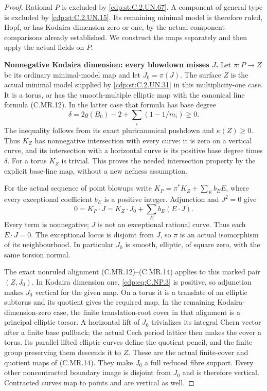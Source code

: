 \begin{proof}
Rational \(P\) is excluded by \ref{cdp:st:C.2.UN.67}. A component
of general type is excluded by \ref{cdp:st:C.2.UN.15}. Its remaining
minimal model is therefore ruled, Hopf, or has
Kodaira dimension zero or one, by the actual
component comparisons already established.
We construct the maps separately and then
apply the actual fields on \(P\).

\par\medskip\noindent\textbf{Nonnegative Kodaira dimension: every blowdown misses \(J\).}
Let \(\pi:P\to Z\) be its ordinary minimal-model
map and let \(J_0=\pi(J)\). The surface \(Z\)
is the actual minimal model supplied by
\ref{cdp:st:C.2.UN.31} in this multiplicity-one case. It is
a torus, or has the smooth-multiple elliptic
map with the canonical line formula
(C.MR.12). In the latter case that formula
has base degree
\[
       \delta=2g(B_0)-2+\sum_i(1-1/m_i)\ge0 .
 \tag{C.NP.3}\label{cdp:eq:C.NP.3}
\]
The inequality follows from its exact
pluricanonical pushdown and
\(\kappa(Z)\ge0\). Thus \(K_Z\) has
nonnegative intersection with every
curve: it is zero on a vertical
curve, and its intersection with
a horizontal curve is its positive
base degree times \(\delta\).
For a torus \(K_Z\) is trivial.
This proves the needed intersection
property by the explicit base-line
map, without a new nefness assumption.

For the actual sequence of point
blowups write
\(K_P=\pi^*K_Z+\sum_E b_EE\),
where every exceptional coefficient
\(b_E\) is a positive integer.
Adjunction and \(J^2=0\) give
\[
       0=K_P\cdot J
          =K_Z\cdot J_0+\sum_E b_E(E\cdot J).
 \tag{C.NP.4}\label{cdp:eq:C.NP.4}
\]
Every term is nonnegative; \(J\)
is not an exceptional rational
curve. Thus each \(E\cdot J=0\).
The exceptional locus is disjoint
from \(J\), so \(\pi\) is an
actual isomorphism of its
neighbourhood. In particular
\(J_0\) is smooth, elliptic,
of square zero, with the
same torsion normal.

The exact nonruled alignment
(C.MR.12)--(C.MR.14) applies
to this marked pair \((Z,J_0)\).
In Kodaira dimension one,
\eqref{cdp:eq:C.NP.3} is positive, so
adjunction makes \(J_0\)
vertical for the given map.
On a torus it is a translate
of an elliptic subtorus and
its quotient gives the
required map. In the remaining
Kodaira-dimension-zero case,
the finite translation-root
cover in that alignment is a
principal elliptic torsor.
A horizontal lift of \(J_0\)
trivializes its integral Chern
vector after a finite base
pullback; the actual Cech
period lattice then makes
the cover a torus. Its
parallel lifted elliptic
curves define the quotient
pencil, and the finite
group preserving them
descends it to \(Z\).
These are the actual
finite-cover and quotient
maps of (C.MR.14).
They make \(J_0\) a full
reduced fibre support.
Every other noncontracted
boundary image is disjoint
from \(J_0\) and is therefore
vertical. Contracted curves
map to points and are
vertical as well.


\end{proof}
